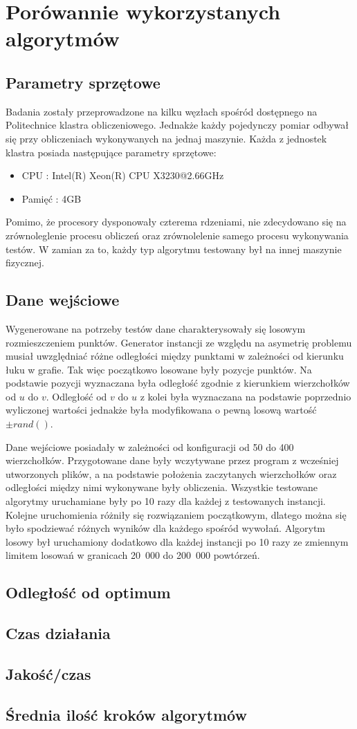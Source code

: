 \section{Porówannie wykorzystanych algorytmów}

\subsection{Parametry sprzętowe}

Badania zostały przeprowadzone na kilku węzłach spośród dostępnego na
Politechnice klastra obliczeniowego. Jednakże każdy pojedynczy pomiar
odbywał się przy obliczeniach wykonywanych na jednaj maszynie.
Każda z jednostek klastra posiada następujące parametry sprzętowe:
\begin{itemize}
 \item CPU : Intel(R) Xeon(R) CPU X3230@2.66GHz
 \item Pamięć : 4GB
\end{itemize}
Pomimo, że procesory dysponowały czterema rdzeniami, nie zdecydowano się
na zrównoleglenie procesu obliczeń oraz zrównolelenie samego procesu
wykonywania testów. W zamian za to, każdy typ algorytmu testowany był
na innej maszynie fizycznej.

\subsection{Dane wejściowe}

Wygenerowane na potrzeby testów dane charakterysowały się
losowym rozmieszczeniem punktów. Generator instancji ze względu na
asymetrię problemu musiał uwzględniać różne odległości między punktami
w zależności od kierunku łuku w grafie. Tak więc początkowo losowane były
pozycje punktów. Na podstawie pozycji wyznaczana była odległość
zgodnie z kierunkiem wierzchołków od $u$ do $v$. Odległość od $v$ do $u$
z kolei była wyznaczana na podstawie poprzednio wyliczonej wartości
jednakże była modyfikowana o pewną losową wartość $\pm rand()$.


Dane wejściowe posiadały w zależności od konfiguracji od 50 do 400
wierzchołków. Przygotowane dane były wczytywane przez program z wcześniej
utworzonych plików, a na podstawie położenia zaczytanych wierzchołków
oraz odległości między nimi wykonywane były 
obliczenia. Wszystkie testowane algorytmy uruchamiane
były po 10 razy dla każdej z testowanych instancji. Kolejne uruchomienia
różniły się rozwiązaniem początkowym, dlatego można się było spodziewać
różnych wyników dla każdego spośród wywołań. Algorytm 
losowy był uruchamiony dodatkowo dla każdej instancji po 10 razy ze zmiennym
limitem losowań w granicach 20~000 do 200~000 powtórzeń.

\subsection{Odległość od optimum}

\subsection{Czas działania}

\subsection{Jakość/czas}

\subsection{Średnia ilość kroków algorytmów}